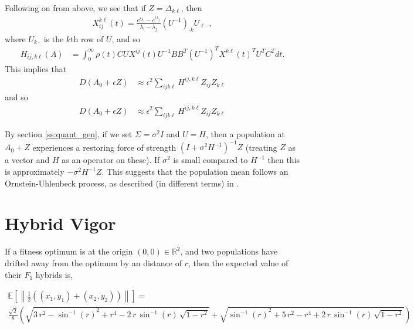\documentclass{article}
\newcommand{\R}{\mathbb{R}}
\newcommand{\1}{\mathbbm{1}}
\begin{document}
Following on from above, we see that if $Z=\Delta_{k \ell}$, then
\begin{equation}
  \begin{aligned}
      X_{ij}^{k\ell}(t) = 
      \frac{ e^{t \lambda_i} - e^{t \lambda_j} }{ \lambda_i - \lambda_j } 
      (U^{-1})_{\cdot k} U_{\ell \cdot},
  \end{aligned}
\end{equation}
where $U_{k \cdot}$ is the $k$th row of $U$,
and so
\begin{equation}
    \begin{aligned}
        H_{ij, k\ell}(A)
        &=
        \int_0^\infty
            \rho(t) C U X^{ij}(t) U^{-1} B B^T (U^{-1})^T X^{k\ell}(t)^T U^T C^T
        dt .
    \end{aligned}
\end{equation}
This implies that
\begin{equation}
    \begin{aligned}
        D(A_0+\epsilon Z)
        &\approx \epsilon^2\sum_{ijk\ell} H^{ij,k\ell} Z_{ij} Z_{k\ell} 
    \end{aligned}
\end{equation}
and so
\begin{equation}
    \begin{aligned}
        D(A_0+\epsilon Z)
        &\approx \epsilon^2\sum_{ijk\ell} H^{ij,k\ell} Z_{ij} Z_{k\ell} 
    \end{aligned}
\end{equation}

By section \ref{ss:quant_gen},
if we set $\Sigma=\sigma^2 I$ and $U=H$,
then a population at $A_0+Z$ experiences a restoring force of strength
$(I + \sigma^2 H^{-1})^{-1} Z$ (treating $Z$ as a vector and $H$ as an operator on these).
If $\sigma^2$ is small compared to $H^{-1}$
then this is approximately $-\sigma^2 H^{-1} Z$.
This suggests that the population mean follows an Ornstein-Uhlenbeck process,
as described (in different terms) in \citet{hansen1996translating}.

\section{Hybrid Vigor}

If a fitness optimum is at the origin $(0,0) \in \R^{2}$, and two populations have drifted away from the optimum by an distance of $r$, then the expected value of their $F_1$ hybrids is,

\begin{align*}
  \mathbb{E}\left[ \left\lVert \frac{1}{2} ((x_1,y_1) + (x_2,y_2))  \right\rVert \right] = \\
  \frac{\sqrt{2}}{8}\left(\sqrt{3\, r^2 - {\sin^{-1}\!\left(r\right)}^2 + r^4 - 2\, r\, \sin^{-1}\!\left(r\right)\, \sqrt{1 - r^2}} + \sqrt{{\sin^{-1}\!\left(r\right)}^2 + 5\, r^2 - r^4 + 2\, r\, \sin^{-1}\!\left(r\right)\, \sqrt{1 - r^2}}\right)
\end{align*} 
\end{document}
